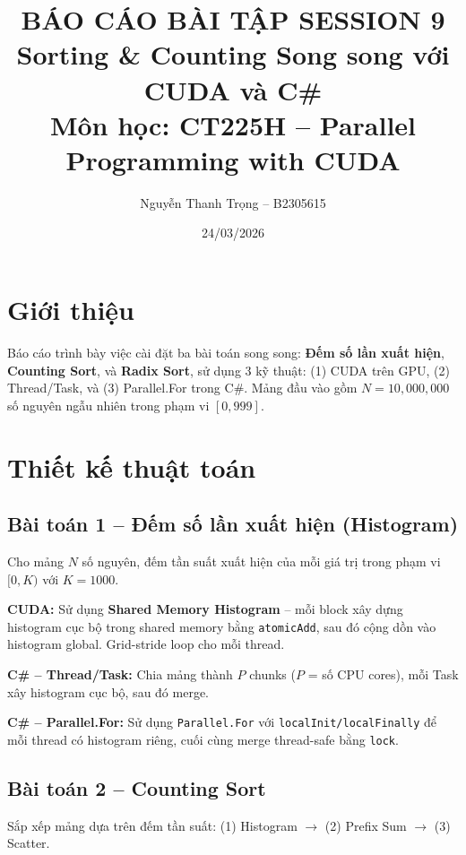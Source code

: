 \documentclass[12pt,a4paper]{article}
\title{
    \textbf{BÁO CÁO BÀI TẬP SESSION 9} \\[0.3cm]
    \large Sorting \& Counting Song song với CUDA và C\# \\[0.5cm]
    \normalsize Môn học: CT225H -- Parallel Programming with CUDA
}
\author{Nguyễn Thanh Trọng -- B2305615}
\date{24/03/2026}
\begin{document}
\maketitle

\section{Giới thiệu}
Báo cáo trình bày việc cài đặt ba bài toán song song: \textbf{Đếm số lần xuất hiện}, \textbf{Counting Sort}, và \textbf{Radix Sort}, sử dụng 3 kỹ thuật: (1) CUDA trên GPU, (2) Thread/Task, và (3) Parallel.For trong C\#. Mảng đầu vào gồm $N = 10{,}000{,}000$ số nguyên ngẫu nhiên trong phạm vi $[0, 999]$.

\section{Thiết kế thuật toán}

\subsection{Bài toán 1 -- Đếm số lần xuất hiện (Histogram)}

Cho mảng $N$ số nguyên, đếm tần suất xuất hiện của mỗi giá trị trong phạm vi $[0, K)$ với $K = 1000$.

\textbf{CUDA:} Sử dụng \textbf{Shared Memory Histogram} -- mỗi block xây dựng histogram cục bộ trong shared memory bằng \texttt{atomicAdd}, sau đó cộng dồn vào histogram global. Grid-stride loop cho mỗi thread.

\textbf{C\# -- Thread/Task:} Chia mảng thành $P$ chunks ($P$ = số CPU cores), mỗi Task xây histogram cục bộ, sau đó merge.

\textbf{C\# -- Parallel.For:} Sử dụng \texttt{Parallel.For} với \texttt{localInit/localFinally} để mỗi thread có histogram riêng, cuối cùng merge thread-safe bằng \texttt{lock}.

\subsection{Bài toán 2 -- Counting Sort}

Sắp xếp mảng dựa trên đếm tần suất: (1) Histogram $\rightarrow$ (2) Prefix Sum $\rightarrow$ (3) Scatter.
\end{document}
